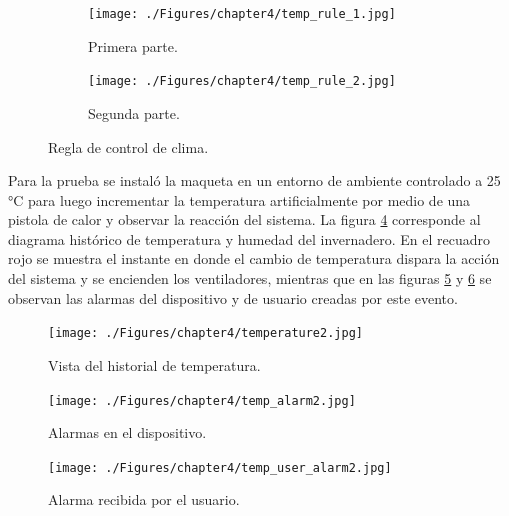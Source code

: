 
\begin{figure}[htpb]
     \centering
       \begin{subfigure}[b]{\textwidth}
	    \centering
			\texttt{[image: ./Figures/chapter4/temp\_rule\_1.jpg]}
			\caption{Primera parte.}
		\label{fig:temp_rule_1}
     \end{subfigure}
          \hfill
     \begin{subfigure}[b]{\textwidth}
		\centering
			\texttt{[image: ./Figures/chapter4/temp\_rule\_2.jpg]}
			\caption{Segunda parte.}
		\label{fig:temp_rule_2}
     \end{subfigure}
     \hfill
        \caption[Regla de control de clima]{Regla de control de clima.}
        \label{fig:temp_rule}
\end{figure}


Para la prueba se instaló la maqueta en un entorno de ambiente controlado a 25 °C para luego incrementar la temperatura artificialmente por medio de una pistola de calor y observar la reacción del sistema. La figura \ref{fig:temp_graph} corresponde al diagrama histórico de temperatura y humedad del invernadero. En el recuadro rojo se muestra el instante en donde el cambio de temperatura dispara la acción del sistema y se encienden los ventiladores, mientras que en las figuras \ref{fig:temp_alarm} y \ref{fig:temp_alarm_user} se observan las alarmas del dispositivo y de usuario creadas por este evento.  







\begin{figure}[h]
	\centering
		 \texttt{[image: ./Figures/chapter4/temperature2.jpg]}
		\caption{Vista del historial de temperatura.}
		\label{fig:temp_graph}
\end{figure}
\begin{figure}[h]
		\centering
		\texttt{[image: ./Figures/chapter4/temp\_alarm2.jpg]}
		\caption{Alarmas en el dispositivo.}
		\label{fig:temp_alarm}
\end{figure}	
\begin{figure}[h]
		\centering
		\texttt{[image: ./Figures/chapter4/temp\_user\_alarm2.jpg]}
		\caption{Alarma recibida por el usuario.}
		\label{fig:temp_alarm_user}
\end{figure}


